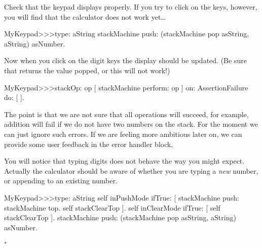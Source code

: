 \documentclass[a4paper,10pt,twoside]{book}
\begin{document}
Check that the keypad displays properly.
If you try to click on the keys, however, you will find that the calculator does not work yet\ldots{}

\begin{code}{}
MyKeypad>>>type: aString
	stackMachine push: (stackMachine pop asString, aString) asNumber.
\end{code}
Now when you click on the digit keys the display should be updated.
(Be sure that  returns the value popped, or this will not work!)



\begin{code}{}
MyKeypad>>>stackOp: op
	[ stackMachine perform: op ] on: AssertionFailure do: [ ].
\end{code}

The point is that we are not sure that all operations will succeed, for example, addition will fail if we do not have two numbers on the stack.
For the moment we can just ignore such errors.
If we are feeling more ambitious later on, we can provide some user feedback in the error handler block.


You will notice that typing digits does not behave the way you might expect.
Actually the calculator should be aware of whether you are typing a \emph{new} number, or appending to an existing number.


\begin{code}{}
MyKeypad>>>type: aString
	self inPushMode ifTrue: [
		stackMachine push: stackMachine top.
		self stackClearTop ].
	self inClearMode ifTrue: [ self stackClearTop ].
	stackMachine push: (stackMachine pop asString, aString) asNumber.
\end{code}
"
\end{document}
